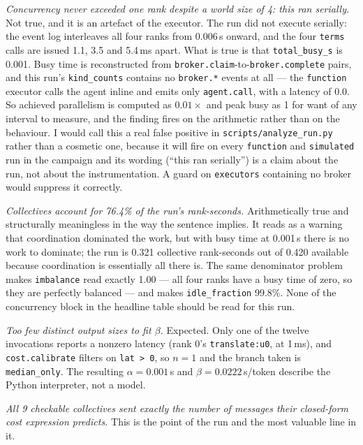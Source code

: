 \documentclass[11pt]{article}
\begin{document}
 \emph{Concurrency never exceeded one rank despite a world size of 4: this ran
serially.} Not true, and it is an artefact of the executor. The run did not execute serially: the
event log interleaves all four ranks from 0.006\,s onward, and the four \texttt{terms} calls are
issued 1.1, 3.5 and 5.4\,ms apart. What is true is that \texttt{total\_busy\_s} is 0.001. Busy time
is reconstructed from \texttt{broker.claim}-to-\texttt{broker.complete} pairs, and this run's
\texttt{kind\_counts} contains no \texttt{broker.*} events at all --- the \texttt{function}
executor calls the agent inline and emits only \texttt{agent.call}, with a latency of 0.0. So
achieved parallelism is computed as $0.01\times$ and peak busy as 1 for want of any interval to
measure, and the finding fires on the arithmetic rather than on the behaviour. I would call this
a real false positive in \texttt{scripts/analyze\_run.py} rather than a cosmetic one, because it
will fire on every \texttt{function} and \texttt{simulated} run in the campaign and its wording
(``this ran serially'') is a claim about the run, not about the instrumentation. A guard on
\texttt{executors} containing no broker would suppress it correctly.

 \emph{Collectives account for 76.4\% of the run's rank-seconds.} Arithmetically
true and structurally meaningless in the way the sentence implies. It reads as a warning that
coordination dominated the work, but with busy time at 0.001\,s there is no work to dominate; the
run is 0.321 collective rank-seconds out of 0.420 available because coordination is essentially
all there is. The same denominator problem makes \texttt{imbalance} read exactly 1.00 --- all four
ranks have a busy time of zero, so they are perfectly balanced --- and makes
\texttt{idle\_fraction} 99.8\%. None of the concurrency block in the headline table should be read
for this run.

 \emph{Too few distinct output sizes to fit $\beta$.} Expected. Only one of the
twelve invocations reports a nonzero latency (rank 0's \texttt{translate:u0}, at 1\,ms), and
\texttt{cost.calibrate} filters on \texttt{lat > 0}, so $n=1$ and the branch taken is
\texttt{median\_only}. The resulting $\alpha=0.001$\,s and $\beta=0.0222$\,s/token describe the
Python interpreter, not a model.

 \emph{All 9 checkable collectives sent exactly the number of messages their
closed-form cost expression predicts.} This is the point of the run and the most valuable line in
it.
\end{document}
